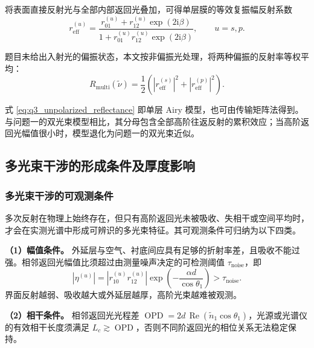 \documentclass[withoutpreface,bwprint]{cumcmthesis}
\begin{document}
将表面直接反射光与全部内部返回光叠加，可得单层膜的等效复振幅反射系数
\begin{equation}
	r_{\mathrm{eff}}^{(u)}
	=
	\frac{
		r_{01}^{(u)}
		+
		r_{12}^{(u)}\exp(2\mathrm{i}\beta)
	}{
		1+
		r_{01}^{(u)}r_{12}^{(u)}
		\exp(2\mathrm{i}\beta)
	},
	\qquad u=s,p.
	\label{eq:q3_effective_reflection_coefficient}
\end{equation}

题目未给出入射光的偏振状态，本文按非偏振光处理，将两种偏振的反射率等权平均：
\begin{equation}
	R_{\mathrm{multi}}(\widetilde\nu)
	=
	\frac{1}{2}
	\left(
	\left|r_{\mathrm{eff}}^{(s)}\right|^2
	+
	\left|r_{\mathrm{eff}}^{(p)}\right|^2
	\right).
	\label{eq:q3_unpolarized_reflectance}
\end{equation}

式 \eqref{eq:q3_unpolarized_reflectance} 即单层 Airy 模型，也可由传输矩阵法得到。与问题一的双光束模型相比，其分母包含全部高阶往返反射的累积效应；当高阶返回光幅值很小时，模型退化为问题一的双光束近似。

\subsection{多光束干涉的形成条件及厚度影响}
\label{subsec:q3_conditions_effects}

\subsubsection{多光束干涉的可观测条件}

多次反射在物理上始终存在，但只有高阶返回光未被吸收、失相干或空间平均时，才会在实测光谱中形成可辨识的多光束特征。其可观测条件可归纳为以下四类。

\textbf{（1）幅值条件。}
外延层与空气、衬底间应具有足够的折射率差，且吸收不能过强。相邻返回光幅值比须超过由测量噪声决定的可检测阈值 $\tau_{\mathrm{noise}}$，即
\begin{equation}
	\left|\eta^{(u)}\right|
	=
	\left|r_{10}^{(u)}r_{12}^{(u)}\right|
	\exp\!\left(-\frac{\alpha d}{\cos\theta_1}\right)
	>\tau_{\mathrm{noise}}.
	\label{eq:q3_detectable_amplitude_ratio}
\end{equation}
界面反射越弱、吸收越大或外延层越厚，高阶光束越难被观测。

\textbf{（2）相干条件。}
相邻返回光光程差 $\operatorname{OPD}=2d\,\operatorname{Re}(\widetilde n_1\cos\theta_1)$，光源或光谱仪的有效相干长度须满足 $L_c\gtrsim\operatorname{OPD}$，否则不同阶返回光的相位关系无法稳定保持。
\end{document}
